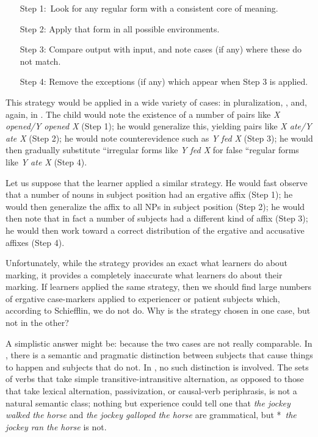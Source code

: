 \begin{enumerate}[labelindent=0pt, leftmargin=!, labelwidth=\widthof{Step 4:}]
\item[Step 1:\,]Look for any regular form with a consistent core of meaning.
\item[Step 2:]Apply that form in all possible environments.
\item[Step 3:]Compare output with input, and note cases (if any) where these do not match.
\item[Step 4:]Remove the exceptions (if any) which appear when Step 3 is applied.
\end{enumerate}

This strategy would be applied in a wide variety of cases: in  pluralization, , and, again, in . The child would note the existence of a number of pairs like \textit{X opened/Y opened X} (Step 1); he would generalize this, yielding pairs like \textit{X ate/Y ate X} (Step 2); he would note counterevidence such as \textit{Y fed X} (Step 3); he would then gradually substitute ``irregular forms like \textit{Y fed X} for false ``regular forms like \textit{Y ate X} (Step 4).

Let us suppose that the  learner applied a similar strategy. He would fast observe that a number of nouns in subject position had an ergative affix (Step 1); he would then generalize the affix to all NPs in subject position (Step 2); he would then note that in fact a number of subjects had a different kind of affix (Step 3); he would then work toward a correct distribution of the ergative and accusative affixes (Step 4).

Unfortunately, while the  strategy provides an exact  what  learners do about  marking, it provides a completely inaccurate  what  learners do about their  marking. If  learners applied the same strategy, then we should find large numbers of ergative case-markers applied to experiencer or patient subjects which, according to Schiefflin, we do not do. Why is the  strategy chosen in one case, but not in the other? 

A simplistic answer might be: because the two cases are not really comparable. In , there is a semantic and pragmatic distinction between subjects that cause things to happen and subjects that do not. In , no such distinction is involved. The sets of verbs that take simple transitive-intransitive alternation, as opposed to those that take lexical alternation, passivization, or causal-verb periphrasis, is not a natural semantic class; nothing but experience could tell one that \textit{the jockey walked the horse} and \textit{the jockey galloped the horse} are grammatical, but *~\textit{the jockey ran the horse} is not.

